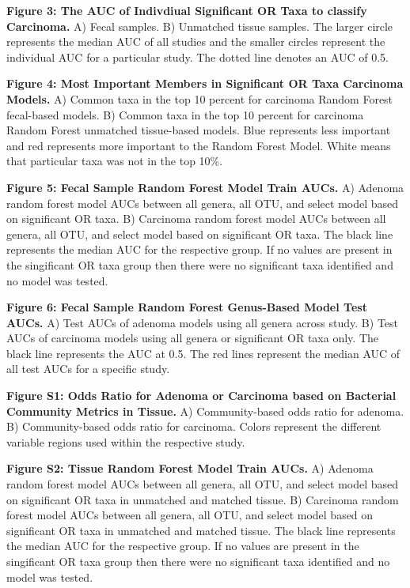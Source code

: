\documentclass[12pt,]{article}
\begin{document}
\textbf{Figure 3: The AUC of Indivdiual Significant OR Taxa to classify
Carcinoma.} A) Fecal samples. B) Unmatched tissue samples. The larger
circle represents the median AUC of all studies and the smaller circles
represent the individual AUC for a particular study. The dotted line
denotes an AUC of 0.5.

\textbf{Figure 4: Most Important Members in Significant OR Taxa
Carcinoma Models.} A) Common taxa in the top 10 percent for carcinoma
Random Forest fecal-based models. B) Common taxa in the top 10 percent
for carcinoma Random Forest unmatched tissue-based models. Blue
represents less important and red represents more important to the
Random Forest Model. White means that particular taxa was not in the top
10\%.

\textbf{Figure 5: Fecal Sample Random Forest Model Train AUCs.} A)
Adenoma random forest model AUCs between all genera, all OTU, and select
model based on significant OR taxa. B) Carcinoma random forest model
AUCs between all genera, all OTU, and select model based on significant
OR taxa. The black line represents the median AUC for the respective
group. If no values are present in the singificant OR taxa group then
there were no significant taxa identified and no model was tested.

\textbf{Figure 6: Fecal Sample Random Forest Genus-Based Model Test
AUCs.} A) Test AUCs of adenoma models using all genera across study. B)
Test AUCs of carcinoma models using all genera or significant OR taxa
only. The black line represents the AUC at 0.5. The red lines represent
the median AUC of all test AUCs for a specific study.

\newpage

\textbf{Figure S1: Odds Ratio for Adenoma or Carcinoma based on
Bacterial Community Metrics in Tissue.} A) Community-based odds ratio
for adenoma. B) Community-based odds ratio for carcinoma. Colors
represent the different variable regions used within the respective
study.

\textbf{Figure S2: Tissue Random Forest Model Train AUCs.} A) Adenoma
random forest model AUCs between all genera, all OTU, and select model
based on significant OR taxa in unmatched and matched tissue. B)
Carcinoma random forest model AUCs between all genera, all OTU, and
select model based on significant OR taxa in unmatched and matched
tissue. The black line represents the median AUC for the respective
group. If no values are present in the singificant OR taxa group then
there were no significant taxa identified and no model was tested.
\end{document}

